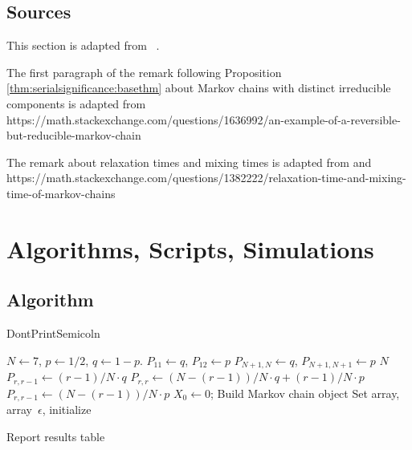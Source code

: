 \documentclass[12pt]{article}
\begin{document}
\subsection*{Sources} This section is adapted from~%
\cite{Chikina2860, Chikina2019, doi:10.1080/2330443X.2020.1806763}.

The first paragraph of the remark following Proposition~%
\ref{thm:serialsignificance:basethm} about Markov chains with distinct
irreducible components is adapted from
https://math.stackexchange.com/questions/1636992/an-example-of-a-reversible-but-reducible-markov-chain

The remark about relaxation times and mixing times is adapted from%
\cite{levin09} and
https://math.stackexchange.com/questions/1382222/relaxation-time-and-mixing-time-of-markov-chains

\hr

\section*{Algorithms, Scripts, Simulations}

\subsection*{Algorithm}

\begin{algorithm}[H]
    DontPrintSemicoln  
      
     
     

     \BlankLine \( N \leftarrow 7 \), \( p \leftarrow 1/2 \),
    \( q \leftarrow 1-p \).\;  \( P_{11} \leftarrow q \), \( P_{12}
    \leftarrow p \)\; \( P_{N+1,N} \leftarrow q \), \( P_{N+1, N+1}
    \leftarrow p \)\;  \KwTo \( N \){ \( P_{r,r-1}
    \leftarrow (r-1)/N \cdot q \)\; \( P_{r,r} \leftarrow (N-(r-1))/N
    \cdot q + (r-1)/N \cdot p \)\; \( P_{r,r-1} \leftarrow (N-(r-1))/N
    \cdot p \)\; }  \( X_0
    \leftarrow 0 \); Build Markov chain object\; \BlankLine Set \pL
    array, \nT array\, \( \epsilon \), initialize \res

     Report results table\;
\end{algorithm}
\end{document}
